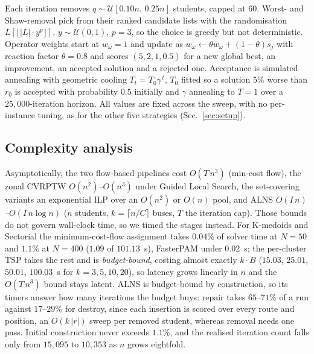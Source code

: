 \documentclass[graybox]{SNmult}
\begin{document}
Each iteration removes $q\sim\mathcal{U}[0.10n,\,0.25n]$ students, capped
at $60$. Worst- and Shaw-removal pick from their ranked candidate lists
with the randomisation $L[\lfloor |L|\cdot y^{p}\rfloor]$,
$y\sim\mathcal{U}(0,1)$, $p=3$, so the choice is greedy but not
deterministic. Operator weights start at $w_\omega=1$ and update as
$w_\omega \gets \theta w_\omega + (1-\theta)s_j$ with reaction factor
$\theta=0.8$ and scores $(5,2,1,0.5)$ for a new global best, an
improvement, an accepted solution and a rejected one. Acceptance is
simulated annealing with geometric cooling $T_t=T_0\gamma^{\,t}$, $T_0$
fitted so a solution $5\%$ worse than $r_0$ is accepted with probability
$0.5$ initially and $\gamma$ annealing to $T=1$ over a $25{,}000$-iteration
horizon. All values are fixed across the sweep, with no per-instance
tuning, as for the other five strategies (Sec.~\ref{sec:setup}).

\subsection{Complexity analysis}\label{sec:complexity}
Asymptotically, the two flow-based pipelines cost $O(T\,n^3)$ (min-cost
flow), the zonal CVRPTW $O(n^2)$--$O(n^3)$ under Guided Local Search, the
set-covering variants an exponential ILP over an $O(n^2)$ or $O(n)$ pool,
and ALNS $O(I\,n)$--$O(I\,n\log n)$ ($n$ students, $k=\lceil n/C\rceil$
buses, $T$ the iteration cap). Those bounds do not govern wall-clock time,
so we timed the stages instead. For K-medoids and Sectorial the
minimum-cost-flow assignment takes $0.04\%$ of solver time at $N=50$ and
$1.1\%$ at $N=400$ ($1.09$ of $101.13$~s), FasterPAM under $0.02$~s; the
per-cluster TSP takes the rest and is \emph{budget-bound}, costing almost
exactly $k\cdot B$ ($15.03$, $25.01$, $50.01$, $100.03$~s for
$k=3,5,10,20$), so latency grows linearly in $n$ and the $O(T\,n^3)$ bound
stays latent. ALNS is budget-bound by construction, so its timers answer
how many iterations the budget buys: repair takes $65$--$71\%$ of a run
against $17$--$29\%$ for destroy, since each insertion is scored over
every route and position, an $O(k\,|r|)$ sweep per removed student,
whereas removal needs one pass. Initial construction never exceeds
$1.1\%$, and the realised iteration count falls only from $15{,}095$ to
$10{,}353$ as $n$ grows eightfold.
\end{document}
